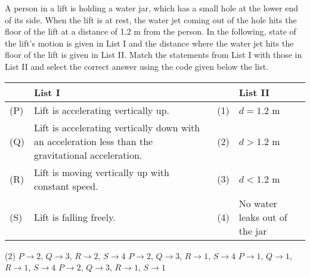 \item A person in a lift is holding a water jar, which has a small hole at the lower end of its side. When the lift is at rest, the water jet coming out of the hole hits the floor of the lift at a distance of 1.2 m from the person. In the following, state of the lift's motion is given in List I and the distance where the water jet hits the floor of the lift is given in List II. Match the statements from List I with those in List II and select the correct answer using the code given below the list.

\begin{center}
    \renewcommand{\arraystretch}{2}
    \begin{table}[h]
        \centering
        \begin{tabular}{p{0.25cm}p{8cm}|p{0.25cm}p{5cm}}
        \hline
        & List I & &List II \\
        \hline
        (P)& Lift is accelerating vertically up. & (1) & \(d = 1.2\) m\\
        (Q)& Lift is accelerating vertically down with an acceleration less than the gravitational acceleration. & (2) & \(d > 1.2\) m\\
        (R)& Lift is moving vertically up with constant speed. & (3) & \(d < 1.2\) m\\
        (S)& Lift is falling freely. & (4) &No water leaks out of the jar\\
        \hline
        \end{tabular}
    \end{table}
\end{center}

\begin{tasks}(2)
    \task $P \rightarrow 2$, $Q \rightarrow 3$, $R \rightarrow 2$, $S \rightarrow 4$
    \task $P \rightarrow 2$, $Q \rightarrow 3$, $R \rightarrow 1$, $S \rightarrow 4$
    \task $P \rightarrow 1$, $Q \rightarrow 1$, $R \rightarrow 1$, $S \rightarrow 4$
    \task $P \rightarrow 2$, $Q \rightarrow 3$, $R \rightarrow 1$, $S \rightarrow 1$
\end{tasks}
